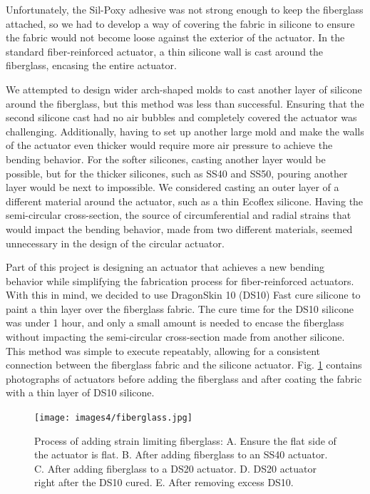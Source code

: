 Unfortunately, the Sil-Poxy adhesive was not strong enough to keep the fiberglass attached, so we had to develop a way of covering the fabric in silicone to ensure the fabric would not become loose against the exterior of the actuator. In the standard fiber-reinforced actuator, a thin silicone wall is cast around the fiberglass, encasing the entire actuator. 

We attempted to design wider arch-shaped molds to cast another layer of silicone around the fiberglass, but this method was less than successful. Ensuring that the second silicone cast had no air bubbles and completely covered the actuator was challenging. Additionally, having to set up another large mold and make the walls of the actuator even thicker would require more air pressure to achieve the bending behavior. For the softer silicones, casting another layer would be possible, but for the thicker silicones, such as SS40 and SS50, pouring another layer would be next to impossible. We considered casting an outer layer of a different material around the actuator, such as a thin Ecoflex silicone. Having the semi-circular cross-section, the source of circumferential and radial strains that would impact the bending behavior, made from two different materials, seemed unnecessary in the design of the circular actuator. 

Part of this project is designing an actuator that achieves a new bending behavior while simplifying the fabrication process for fiber-reinforced actuators. With this in mind, we decided to use DragonSkin 10 (DS10) Fast cure silicone to paint a thin layer over the fiberglass fabric. The cure time for the DS10 silicone was under 1 hour, and only a small amount is needed to encase the fiberglass without impacting the semi-circular cross-section made from another silicone. This method was simple to execute repeatably, allowing for a consistent connection between the fiberglass fabric and the silicone actuator. Fig. \ref{fig:fiberglass} contains photographs of actuators before adding the fiberglass and after coating the fabric with a thin layer of DS10 silicone. 

\begin{figure}[h!]
    \centering
    \texttt{[image: images4/fiberglass.jpg]}
    \caption{Process of adding strain limiting fiberglass: A. Ensure the flat side of the actuator is flat. B. After adding fiberglass to an SS40 actuator. C. After adding fiberglass to a DS20 actuator. D. DS20 actuator right after the DS10 cured. E. After removing excess DS10.}
    \label{fig:fiberglass}
\end{figure}

